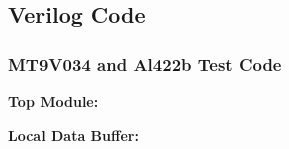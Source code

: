 \subsection{Verilog Code}
\subsubsection{MT9V034 and Al422b Test Code} \label{mt9v034TestCode}
\textbf{Top Module:}
\singlespacing

\doublespacing
\par
\textbf{Local Data Buffer:}
\singlespacing

\doublespacing